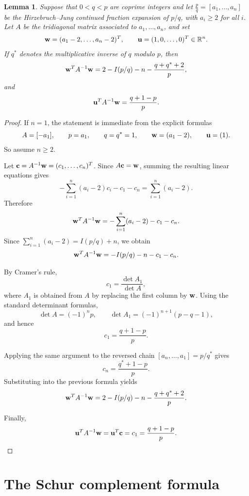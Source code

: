\documentclass[11pt]{amsart}
\theoremstyle{plain}
\newtheorem{lemma}[theorem]{Lemma}
\theoremstyle{definition}
\theoremstyle{remark}
\newcommand{\R}{\mathbb{R}}
\begin{document}
\begin{lemma}\label{lem:leg}
Suppose that $0<q<p$ are coprime integers and let
$\frac pq=[a_1,\dots,a_n]$ be the Hirzebruch--Jung continued fraction
expansion of $p/q$, with $a_i\ge 2$ for all $i$. Let $A$ be the
tridiagonal matrix associated to $a_1,\ldots,a_n$, and set
\[
{\bf w}=(a_1-2,\dots,a_n-2)^T,
\qquad
{\bf u}=(1,0,\dots,0)^T\in\R^n.
\]
If $q^*$ denotes the multiplicative inverse of $q$ modulo $p$, then
\[
{\bf w}^TA^{-1}{\bf w}
=
2-I(p/q)-n-\frac{q+q^*+2}{p},
\]
and
\[
{\bf u}^TA^{-1}{\bf w}
=
\frac{q+1-p}{p}.
\]
\end{lemma}

\begin{proof}
If $n=1$, the statement is immediate from the explicit formulas
\[
A=[-a_1],\qquad p=a_1,\qquad q=q^*=1,\qquad
{\bf w}=(a_1-2),\qquad {\bf u}=(1).
\]
So assume $n\ge 2$.

Let ${\bf c}=A^{-1}{\bf w}=(c_1,\dots,c_n)^T$. Since
$A{\bf c}={\bf w}$, summing the resulting linear equations gives
\[
-\sum_{i=1}^n(a_i-2)c_i-c_1-c_n
=
\sum_{i=1}^n(a_i-2).
\]
Therefore
\[
{\bf w}^TA^{-1}{\bf w}
=
-\sum_{i=1}^n(a_i-2)-c_1-c_n.
\]
Since $\sum_{i=1}^n(a_i-2)=I(p/q)+n$, we obtain
\[
{\bf w}^TA^{-1}{\bf w}
=
-I(p/q)-n-c_1-c_n.
\]

By Cramer's rule,
\[
c_1=\frac{\det A_1}{\det A},
\]
where $A_1$ is obtained from $A$ by replacing the first column by
${\bf w}$. Using the standard determinant formulas,
\[
\det A=(-1)^n p,
\qquad
\det A_1=(-1)^{n+1}(p-q-1),
\]
and hence
\[
c_1=\frac{q+1-p}{p}.
\]

Applying the same argument to the reversed chain
$[a_n,\dots,a_1]=p/q^*$ gives
\[
c_n=\frac{q^*+1-p}{p}.
\]
Substituting into the previous formula yields
\[
{\bf w}^TA^{-1}{\bf w}
=
2-I(p/q)-n-\frac{q+q^*+2}{p}.
\]

Finally,
\[
{\bf u}^TA^{-1}{\bf w}={\bf u}^T{\bf c}=c_1=\frac{q+1-p}{p}.
\]
\end{proof}

\section{The Schur complement formula}\label{sec:schur}
\end{document}
